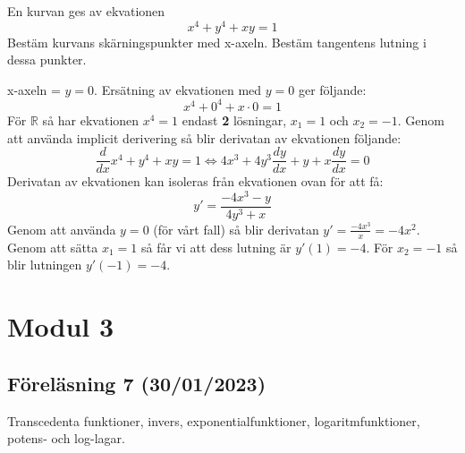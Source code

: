 \documentclass{report}
\begin{document}
\pagebreak
\qs{}
{
En kurvan ges av ekvationen
\begin{equation*}
x^4 + y^4 +xy = 1
\end{equation*}
Bestäm kurvans skärningspunkter med x-axeln. Bestäm tangentens lutning i dessa punkter. 
}

\sol x-axeln = $ y=0 $. Ersätning av ekvationen med $ y=0 $ ger följande: 
\begin{equation*}
x^4+0^4+x \cdot 0 = 1
\end{equation*}
För $ \mathbb{R} $ så har ekvationen $ x^4 = 1 $ endast \textbf{2} lösningar, $ x_1 = 1 $ och $ x_2 = -1 $. Genom att använda implicit derivering så blir derivatan av ekvationen följande:
\begin{equation*}
\frac{d}{dx} x^4 + y^4 + xy = 1 \iff 4x^3 + 4y^3 \frac{dy}{dx} + y + x \frac{dy}{dx} = 0
\end{equation*}
Derivatan av ekvationen kan isoleras från ekvationen ovan för att få:
\begin{equation*}
y' = \frac{-4x^3-y}{4y^3+x} 
\end{equation*}
Genom att använda $ y = 0 $ (för vårt fall) så blir derivatan $ y' = \frac{-4x^3}{x} = -4x^2  $. Genom att sätta $ x_1 = 1 $ så får vi att dess lutning är $ y'(1) = -4 $. För $ x_2 = -1 $ så blir lutningen $ y'(-1) = -4 $.  

\vspace{50pt}


\pagebreak

\chapter{Modul 3}

\section{Föreläsning 7 (30/01/2023)}
Transcedenta funktioner, invers, exponentialfunktioner, logaritmfunktioner, potens- och log-lagar.\\\\
\end{document}
